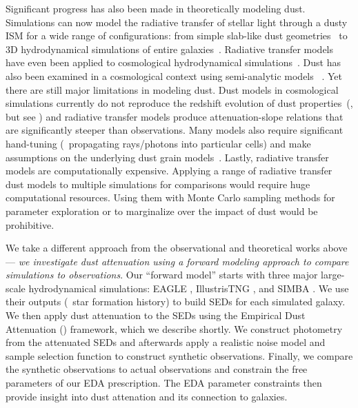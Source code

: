 
Significant progress has also been made in theoretically modeling dust. 
Simulations can now model the radiative transfer of stellar light
through a dusty ISM for a wide range of configurations:
from simple slab-like dust geometries~\citep[\eg][]{witt1996, witt2000,
seon2016} to 3D hydrodynamical simulations of entire
galaxies~\citep[\eg][]{jonsson2006, rocha2008, hayward2015, natale2015,
hou2017}. 
Radiative transfer models have even been applied to cosmological
hydrodynamical simulations~\cite[\eg][]{camps2015, narayanan2018,
cochrane2019, rodriguez-gomez2019, trayford2020}. 
Dust has also been examined in a cosmological context using 
semi-analytic models ~\citep[SAMs; \eg][]{granato2000, fontanot2009, wilkins2012,
gonzalez-perez2013, popping2017}. 
Yet there are still major limitations in modeling dust. 
Dust models in cosmological simulations currently do not reproduce the
redshift evolution of dust properties~(\citealp{somerville2012, yung2019,
vogelsberger2020}, but see \citealp{li2019}) and radiative transfer models
produce attenuation-slope relations that are significantly steeper than observations. 
Many models also require significant hand-tuning (\eg~propagating rays/photons into
particular cells) and make assumptions on the underlying dust grain models~\citep[see][for a review]{steinacker2013}. 
Lastly, radiative transfer models are computationally expensive.  
Applying a range of radiative transfer dust models to multiple simulations for
comparisons would require huge computational resources.
Using them with Monte Carlo sampling methods for parameter exploration or to
marginalize over the impact of dust would be prohibitive.  

We take a different approach from the observational and theoretical works
above --- \emph{we investigate dust attenuation using a forward modeling
approach to compare simulations to observations}.
Our ``forward model'' starts with three major large-scale hydrodynamical
simulations: EAGLE \citep{schaye2015}, IllustrisTNG \citep{nelson2019},
and SIMBA \citep{dave2019}. 
We use their outputs (\eg~star formation history) to build SEDs for each
simulated galaxy.
We then apply dust attenuation to the SEDs using the Empirical Dust
Attenuation (\eda) framework, which we describe shortly.
We construct photometry from the attenuated SEDs and afterwards apply a 
realistic noise model and sample selection function to construct synthetic
observations. 
Finally, we compare the synthetic observations to actual observations and
constrain the free parameters of our EDA prescription. 
The EDA parameter constraints then provide insight into dust attenation and its
connection to galaxies.

